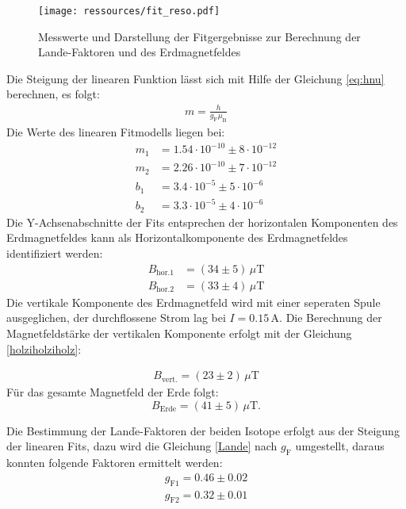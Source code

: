 \begin{figure}
\centering
\texttt{[image: ressources/fit\_reso.pdf]}
\caption{Messwerte und Darstellung der Fitgergebnisse zur Berechnung
der Land$\grave{\text{e}}$-Faktoren und des Erdmagnetfeldes}
\label{plot1}
\end{figure}

Die Steigung der linearen Funktion lässt sich mit Hilfe der Gleichung \eqref{eq:hnu}
berechnen, es folgt:
\begin{align}
    \label{Lande}
    m=\frac{h}{g_\text{F}\mu_\text{B}}
\end{align}
Die Werte des linearen Fitmodells liegen bei:
\begin{align}
    \nonumber
    m_1&=1.54\cdot 10^{-10} \pm 8\cdot 10^{-12}\\
    \nonumber
    m_2&=2.26\cdot 10^{-10} \pm 7\cdot 10^{-12}\\
    \nonumber
    b_1&=3.4\cdot 10^{-5} \pm 5\cdot 10^{-6}\\
    \nonumber
    b_2&=3.3\cdot 10^{-5} \pm 4\cdot 10^{-6}
\end{align}
Die Y-Achsenabschnitte der Fits entsprechen der horizontalen Komponenten
des Erdmagnetfeldes kann als Horizontalkomponente des Erdmagnetfeldes
identifiziert werden:
\begin{align}
    \nonumber
    B_{\text{hor.}1}&=(34 \pm 5)\, \mu\text{T}\\
    \nonumber
    B_{\text{hor.}2}&=(33 \pm 4)\, \mu\text{T}
\end{align}
Die vertikale Komponente des Erdmagnetfeld wird mit einer seperaten Spule
ausgeglichen, der durchflossene Strom lag bei $I=0.15\,\text{A}$. Die
Berechnung der Magnetfeldstärke der vertikalen Komponente erfolgt mit der Gleichung
\eqref{holziholziholz}:

\begin{align}
    B_\text{vert.}=(23 \pm 2)\, \mu \text{T}
\end{align}
Für das gesamte Magnetfeld der Erde folgt:
$$B_\text{Erde}=(41\pm 5 )\, \mu \text{T}.$$

Die Bestimmung der Land$\grave{\text{e}}$-Faktoren der beiden Isotope
erfolgt aus der Steigung der
linearen Fits, dazu wird die Gleichung \eqref{Lande} nach $g_\text{F}$
umgestellt, daraus konnten folgende Faktoren ermittelt werden:
\begin{align}
    g_{\text{F}1}=0.46 \pm 0.02 \\
    g_{\text{F}2}=0.32 \pm 0.01
\end{align}

